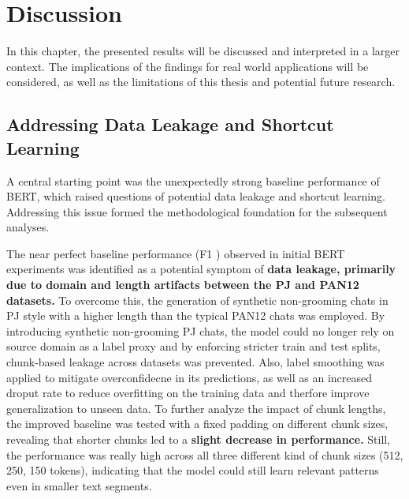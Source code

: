 \chapter{Discussion}
In this chapter, the presented results will be discussed and interpreted in a larger context. The implications of the findings for real world applications will be considered, as well as the limitations of this thesis and potential future research. 

\section{Addressing Data Leakage and Shortcut Learning}
A central starting point was the unexpectedly strong baseline performance of BERT, which raised questions of potential data leakage and shortcut learning. Addressing this issue formed the methodological foundation for the subsequent analyses.

The near perfect baseline performance (F1 ) observed in initial BERT experiments was identified as a potential symptom of \textbf{data leakage, primarily due to domain and length artifacts between the PJ and PAN12 datasets.} To overcome this, the generation of synthetic non-grooming chats in PJ style with a higher length than the typical PAN12 chats was employed. By introducing synthetic non-grooming PJ chats, the model could no longer rely on source domain as a label proxy and by enforcing stricter train and test splits, chunk-based leakage across datasets was prevented. Also, label smoothing was applied to mitigate overconfidecne in its predictions, as well as an increased droput rate to reduce overfitting on the training data and therfore improve generalization to unseen data. To further analyze the impact of chunk lengths, the improved baseline was tested with a fixed padding on different chunk sizes, revealing that shorter chunks led to a \textbf{slight decrease in performance.} Still, the performance was really high across all three different kind of chunk sizes (512, 250, 150 tokens), indicating that the model could still learn relevant patterns even in smaller text segments. 

